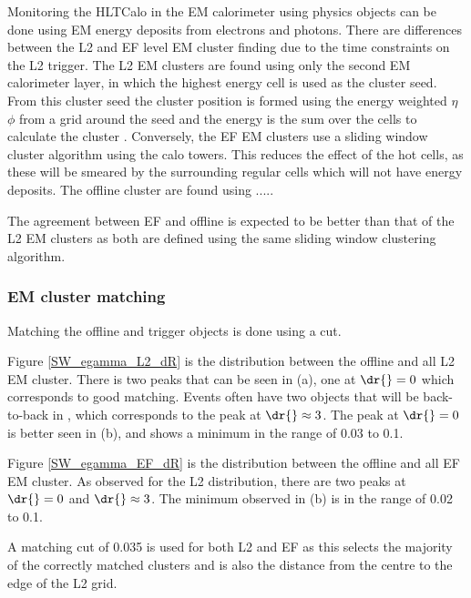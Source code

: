 
Monitoring the HLTCalo in the EM calorimeter using physics objects can be done using EM energy deposits from electrons and photons. 
There are differences between the L2 and EF level EM cluster finding due to the time constraints on the L2 trigger.  
The L2 EM clusters are found using only the second EM calorimeter layer, in which the highest energy cell is used as the cluster seed.
From this cluster seed the cluster position is formed using the energy weighted $\eta$ $\phi$ from a grid  around the seed and the energy is the sum over the cells to calculate the cluster \et{}. 
Conversely, the EF EM clusters use a sliding window cluster algorithm using the calo towers. 
This reduces the effect of the hot cells, as these will be smeared by the surrounding regular cells which will not have energy deposits.
The offline cluster are found using .....
 
The agreement between EF and offline is expected to be better than that of the L2 EM clusters as both are defined using the same sliding window clustering algorithm. 


\subsubsection{EM cluster matching}

Matching the offline and trigger objects is done using a \dr{} cut.

Figure \ref{SW_egamma_L2_dR} is the \dr{} distribution between the offline and all L2 EM cluster.
There is two peaks that can be seen in (a), one at $\dr{}=0$ which corresponds to good matching.
Events often have two objects that will be back-to-back in \dphi{}, which corresponds to the peak at $\dr{}\approx3$. 
The peak at $\dr{}=0$ is better seen in (b), and shows a minimum in the range \dr{} of 0.03 to 0.1.

Figure \ref{SW_egamma_EF_dR} is the \dr{} distribution between the offline and all EF EM cluster.
As observed for the L2 \dr{} distribution, there are two peaks at $\dr{}=0$ and $\dr{}\approx3$. 
The minimum observed in (b) is in the range \dr{} of 0.02 to 0.1.

A \dr{} matching cut of 0.035 is used for both L2 and EF as this selects the majority of the correctly matched clusters and is also the distance from the centre to the edge of the L2 grid.

